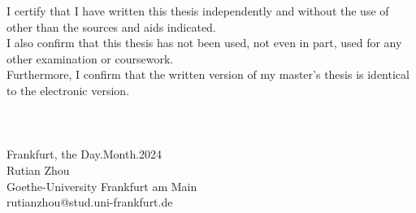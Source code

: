 \documentclass[11pt, class=article, crop=false]{standalone}
\begin{document}
		\clearpage
		\begin{titlepage}
				\noindent
				I certify that I have written this thesis independently and without the use of 
				other than the sources and aids indicated. \\
				I also confirm that this thesis has not been used, not even in part, 
				used for any other examination or coursework.\\
				Furthermore, I confirm that the written version of my master's thesis is identical to the electronic version. \\\\\\\\
				Frankfurt, the Day.Month.2024\\
				\vfill
				\noindent
				Rutian Zhou\\
				Goethe-University Frankfurt am Main\\
				rutianzhou@stud.uni-frankfurt.de
			\end{titlepage}
\end{document}
